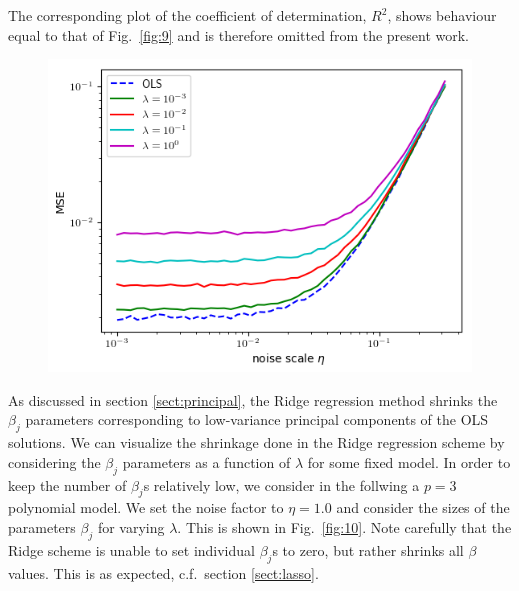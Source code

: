 \documentclass[a4paper, twocolumn]{article}
\newcommand{\fig}[1]{Fig.\ \ref{fig:#1}}
\begin{document}
The corresponding plot of the coefficient of determination, $R^2$, shows behaviour equal to that of \fig{9} and is therefore omitted from the present work.

\begin{figure}
\centering
\includegraphics[width=\linewidth]{MSE_ridge_noise.png}
\end{figure}

As discussed in section \ref{sect:principal}, the Ridge regression method shrinks the $\beta_j$ parameters corresponding to low-variance principal components of the OLS solutions. We can visualize the shrinkage done in the Ridge regression scheme by considering the $\beta_j$ parameters as a function of $\lambda$ for some fixed model. In order to keep the number of $\beta_j$s relatively low, we consider in the follwing a $p=3$ polynomial model. We set the noise factor to $\eta=1.0$ and consider the sizes of the parameters $\beta_j$ for varying $\lambda$. This is shown in \fig{10}. Note carefully that the Ridge scheme is unable to set individual $\beta_j$s to zero, but rather shrinks all $\beta$ values. This is as expected, c.f.\ section \ref{sect:lasso}.
\end{document}
